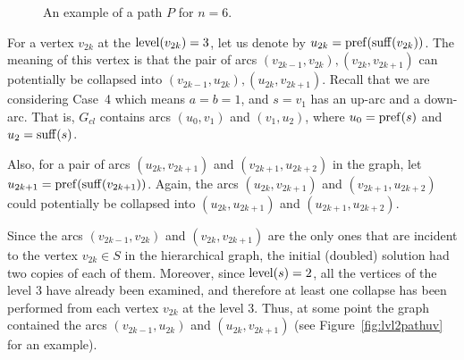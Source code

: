 \begin{figure}[ht]
\begin{center}

\end{center}

\caption{An example of a path $P$ for $n=6$.}\label{fig:lvl2path6}
\end{figure}

For a vertex $v_{2k}$ at the $\operatorname{level} (v_{2k}) = 3 $, let us denote by $u_{2k}=\operatorname{pref}(\operatorname{suff}(v_{2k}))$. The meaning of this vertex is that the pair of arcs $( v_{2k-1}, v_{2k}), (v_{2k}, v_{2k + 1})$ can potentially be collapsed into $( v_{2k-1}, u_{2k}), (u_{2k}, v_{2k + 1})$. Recall that we are considering Case~4 which means $a=b=1$, and $s=v_1$ has an up-arc and a down-arc. That is, $ G_{cl} $ contains arcs $ (u_0, v_1) $ and $ (v_1, u_2) $, where $ u_0 = \operatorname{pref} (s) $ and $ u_2 = \operatorname{suff} (s) $. 

Also, for a pair of arcs $ (u_{2k}, v_{2k + 1}) $ and $ (v_{2k + 1}, u_{2k + 2}) $ in the graph, let $ u_{2k + 1}=\operatorname{pref}(\operatorname{suff}(v_{2k + 1})) $. Again, the arcs $ (u_{2k}, v_{2k + 1}) $ and $ (v_{2k + 1}, u_{2k + 2}) $ could potentially be collapsed into $ (u_{2k}, u_{2k + 1}) $ and $ (u_{2k + 1}, u_{2k + 2}) $.

Since the arcs $ (v_{2k-1}, v_{2k}) $ and $ (v_{2k} , v_{2k + 1}) $ are the only ones that are incident to the vertex $ v_{2k} \in S $ in the hierarchical graph, the initial (doubled) solution had two copies of each of them. Moreover, since $ \operatorname{level} (s) = 2 $, all the vertices of the level $ 3 $ have already been examined, and therefore at least one collapse has been performed from each vertex $ v_ {2k} $ at the level $ 3 $. Thus, at some point the graph contained the arcs $ (v_{2k-1} , u_{2k}) $ and $ (u_{2k}, v_{2k + 1}) $ (see Figure~\ref {fig:lvl2pathuv} for an example).

